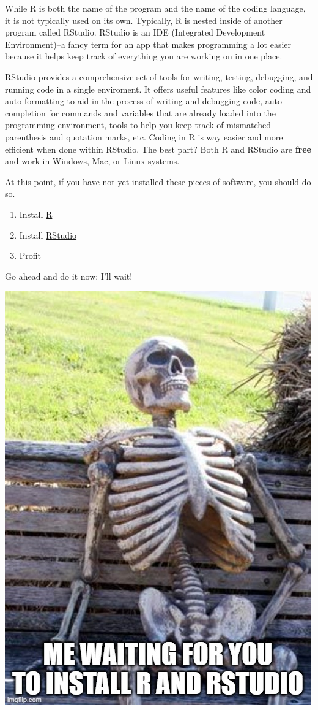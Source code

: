\documentclass[
  letterpaper,
]{book}
\providecommand{\tightlist}{%
  \setlength{\itemsep}{0pt}\setlength{\parskip}{0pt}}\usepackage{longtable,booktabs,array}
\begin{document}
While R is both the name of the program and the name of the coding
language, it is not typically used on its own. Typically, R is nested
inside of another program called RStudio. RStudio is an IDE (Integrated
Development Environment)--a fancy term for an app that makes programming
a lot easier because it helps keep track of everything you are working
on in one place.

RStudio provides a comprehensive set of tools for writing, testing,
debugging, and running code in a single enviroment. It offers useful
features like color coding and auto-formatting to aid in the process of
writing and debugging code, auto-completion for commands and variables
that are already loaded into the programming environment, tools to help
you keep track of mismatched parenthesis and quotation marks, etc.
Coding in R is way easier and more efficient when done within RStudio.
The best part? Both R and RStudio are \textbf{free} and work in Windows,
Mac, or Linux systems.

At this point, if you have not yet installed these pieces of software,
you should do so.

\begin{enumerate}
\def\labelenumi{\arabic{enumi}.}
\tightlist
\item
  Install \href{https://cran.r-project.org/}{R}
\item
  Install \href{https://www.posit.com}{RStudio}
\item
  Profit
\end{enumerate}

Go ahead and do it now; I'll wait!

\begin{center}
\includegraphics[width=0.5\linewidth,height=\textheight,keepaspectratio]{images/waiting.jpg}
\end{center}
\end{document}
